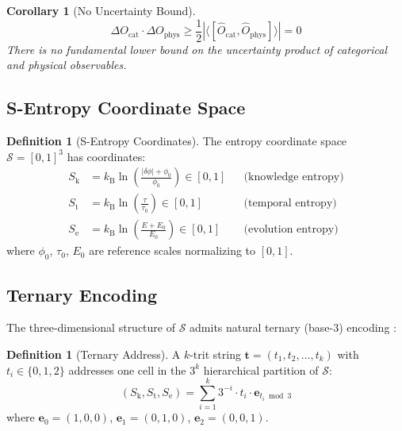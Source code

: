 \documentclass[11pt,twocolumn,a4paper]{article}
\newtheorem{corollary}[theorem]{Corollary}
\theoremstyle{definition}
\newtheorem{definition}[theorem]{Definition}
\theoremstyle{remark}
\newcommand{\kB}{k_{\mathrm{B}}}
\newcommand{\Sk}{S_{\mathrm{k}}}
\newcommand{\St}{S_{\mathrm{t}}}
\newcommand{\Se}{S_{\mathrm{e}}}
\newcommand{\Sspace}{\mathcal{S}}
\begin{document}
\begin{corollary}[No Uncertainty Bound]
\label{cor:no_uncertainty}
\begin{equation}
\Delta O_{\mathrm{cat}} \cdot \Delta O_{\mathrm{phys}} \geq \frac{1}{2} |\langle [\hat{O}_{\mathrm{cat}}, \hat{O}_{\mathrm{phys}}] \rangle| = 0
\end{equation}
There is no fundamental lower bound on the uncertainty product of categorical and physical observables.
\end{corollary}

\subsection{S-Entropy Coordinate Space}

\begin{definition}[S-Entropy Coordinates]
\label{def:s_entropy}
The entropy coordinate space $\Sspace = [0,1]^3$ has coordinates:
\begin{align}
\Sk &= \kB \ln\!\left(\frac{|\delta\phi| + \phi_0}{\phi_0}\right) \in [0,1] && \text{(knowledge entropy)} \\
\St &= \kB \ln\!\left(\frac{\tau}{\tau_0}\right) \in [0,1] && \text{(temporal entropy)} \\
\Se &= \kB \ln\!\left(\frac{E + E_0}{E_0}\right) \in [0,1] && \text{(evolution entropy)}
\end{align}
where $\phi_0$, $\tau_0$, $E_0$ are reference scales normalizing to $[0,1]$.
\end{definition}

\subsection{Ternary Encoding}

The three-dimensional structure of $\Sspace$ admits natural ternary (base-3) encoding \citep{shannon1948}:

\begin{definition}[Ternary Address]
A $k$-trit string $\mathbf{t} = (t_1, t_2, \ldots, t_k)$ with $t_i \in \{0, 1, 2\}$ addresses one cell in the $3^k$ hierarchical partition of $\Sspace$:
\begin{equation}
(\Sk, \St, \Se) = \sum_{i=1}^{k} 3^{-i} \cdot t_i \cdot \mathbf{e}_{t_i \bmod 3}
\end{equation}
where $\mathbf{e}_0 = (1,0,0)$, $\mathbf{e}_1 = (0,1,0)$, $\mathbf{e}_2 = (0,0,1)$.
\end{definition}
\end{document}
